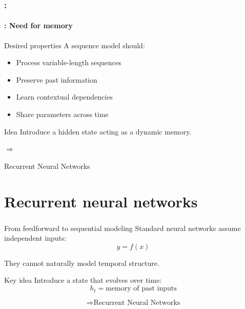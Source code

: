\documentclass[xcolor=table]{beamer}
\begin{document}
\begin{frame}
	\frametitle{\insertshortsubtitle: \insertsection}
	\framesubtitle{\insertsubsection: Need for memory}
	
	\begin{block}{Desired properties}
		A sequence model should:
		\begin{itemize}
			\item Process variable-length sequences
			\item Preserve past information
			\item Learn contextual dependencies
			\item Share parameters across time
		\end{itemize}
	\end{block}

	\begin{block}{Idea}
		\centering
		Introduce a hidden state acting as a dynamic memory.
		
		$\Longrightarrow$ 
		
		Recurrent Neural Networks
	\end{block}
	
\end{frame}



\section{Recurrent neural networks}

\begin{frame}
	\frametitle{\insertshortsubtitle}
	\framesubtitle{\insertsection}
	
	\begin{block}{From feedforward to sequential modeling}
		Standard neural networks assume independent inputs:
		\[
		y = f(x)
		\]
		
		They cannot naturally model temporal structure.
	\end{block}
	
	\begin{block}{Key idea}
		Introduce a state that evolves over time:
		\[
		h_t = \text{memory of past inputs}
		\]
		
		\[
		\Rightarrow \text{Recurrent Neural Networks}
		\]
	\end{block}
	
\end{frame}

\begin{frame}
	\frametitle{\insertshortsubtitle}
	\framesubtitle{\insertsection}
	
	\begin{center}
	\end{center}
	
\end{frame}
\end{document}
